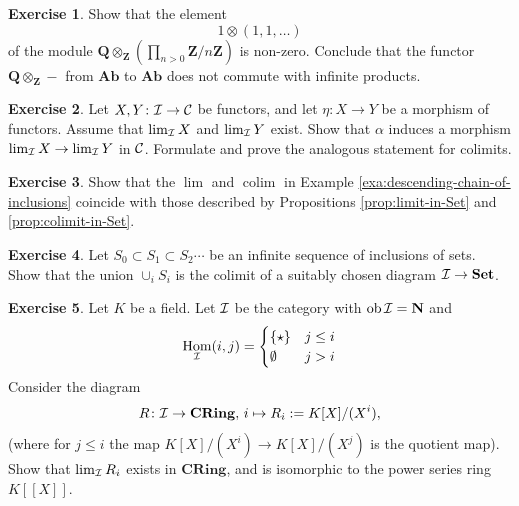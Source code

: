\documentclass[11pt]{amsbook}
\DeclareMathOperator\Hom{Hom}
\DeclareMathOperator\ob{ob}
\DeclareMathOperator\colim{colim}
\def\bQ{{\mathbf{Q}}} \def\bZ{{\mathbf{Z}}} \def\N{{\mathbf{N}}}
\def\bN{{\mathbf{N}}}
\def\Set{\mathbf{Set}}
\def\Ab{\mathbf{Ab}}
\def\CRing{\mathbf{CRing}}
\theoremstyle{plain}
\theoremstyle{definition}
\newtheorem{exercise}{Exercise}
\begin{document}

\begin{exercise}\label{exc:tensor-does-not-preserve-products}
Show that the element
\[
	1 \otimes (1, 1, \ldots )	
\]
of the module  $\bQ\otimes_\bZ \left( \prod_{n>0} \bZ/n\bZ \right)$
is non-zero. Conclude that the functor $\bQ\otimes_\bZ -$ from $\Ab$ to $\Ab$ does not commute with infinite products.
\end{exercise}

\begin{exercise}
Let $X,Y\colon {\mathcal{I}} \to {\mathcal{C}}$ be functors, and let $\eta\colon X \to Y$ be a morphism of functors. Assume that $\lim_{\mathcal{I}} X$ and $\lim_{\mathcal{I}} Y$ exist. Show that $\alpha$ induces a morphism $\lim_{\mathcal{I}} X \to \lim_{\mathcal{I}} Y$ in ${\mathcal{C}}$. Formulate and prove the analogous statement for colimits. 
\end{exercise}

\begin{exercise}
Show that the $\lim$ and $\colim$ in Example \ref{exa:descending-chain-of-inclusions} coincide with those described by
Propositions \ref{prop:limit-in-Set} and \ref{prop:colimit-in-Set}.
\end{exercise}

\begin{exercise}\label{exc:increasing-union}
Let  $S_0 \subset S_1 \subset S_2 \cdots $
be an infinite sequence of inclusions of sets. Show that the union $\cup_i S_i$ is the colimit
of a suitably chosen diagram $\cI \to \Set$.
\end{exercise}

\begin{exercise}Let $K$ be a field. Let ${\mathcal{I}}$ be the category with $\ob \cI = \bN$ and
\[
	\Hom_\cI(i,j) = \begin{cases} \{\star\} & j\leq i \\ \emptyset & j > i \end{cases}
\]
Consider the diagram
\[
	R\colon \cI \to \CRing,\, i \mapsto R_i := K[X]/(X^i),
\]
(where for $j\leq i$ the map $K[X]/(X^i) \to K[X]/(X^j)$ is the quotient map). Show that $\lim_{\mathcal{I}} R_i$ exists in $\CRing$, and is isomorphic to the power series ring $K[[X]]$.
\end{exercise}
\end{document}
